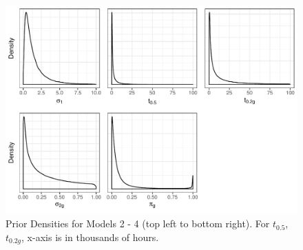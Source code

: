 \documentclass[12pt]{article}
\begin{document}
\begin{figure}[H]
\center
\includegraphics[width=\textwidth]{priormod234.pdf}
\caption{Prior Densities for Models 2 - 4 (top left to bottom right). For $t_{0.5}$, $t_{0.2g}$, x-axis is in thousands of hours.}
\end{figure}
\end{document}
